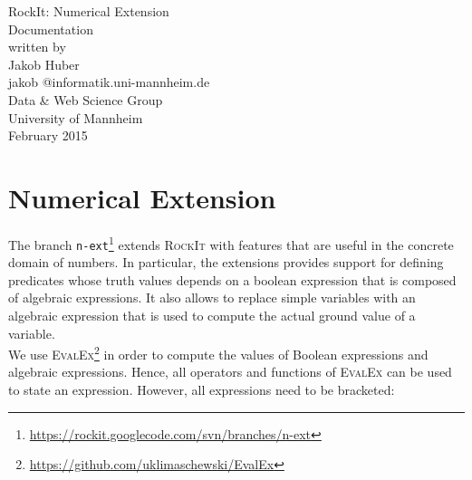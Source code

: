 \documentclass[11pt,titlepage,oneside,openany]{book}
\begin{document}
\begin{titlepage}
	\vspace*{2cm}
  \begin{center}
   {\Large RockIt: Numerical Extension\\}
   \vspace{2cm} 
   {Documentation\\}
   \vspace{2cm}
   {written by\\
    Jakob Huber \\
    jakob @informatik.uni-mannheim.de\\
   }
   \vspace{1cm} 
   {Data \& Web Science Group\\
    University of Mannheim\\} \vspace{2cm}
   {February 2015}
  \end{center}
\end{titlepage} 









\chapter{Numerical Extension}
The branch \texttt{n-ext}\footnote{\url{https://rockit.googlecode.com/svn/branches/n-ext}} extends \textsc{RockIt} with features that are useful in the concrete domain of numbers. In particular, the extensions provides support for defining predicates whose truth values depends on a boolean expression that is composed of algebraic expressions. It also allows to replace simple variables with an algebraic expression that is used to compute the actual ground value of a variable.\\

\noindent We use \textsc{EvalEx}\footnote{\url{https://github.com/uklimaschewski/EvalEx}} in order to compute the values of Boolean expressions and algebraic expressions. Hence, all operators and functions of \textsc{EvalEx} can be used to state an expression. However, all expressions need to be bracketed:
\end{document}
